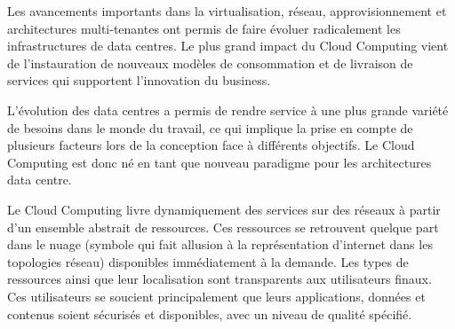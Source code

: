 Les avancements importants dans la virtualisation, réseau, approvisionnement et architectures multi-tenantes ont permis de faire évoluer radicalement les infrastructures de data centres. Le plus grand impact du Cloud Computing vient de l'instauration de nouveaux modèles de consommation et de livraison de services qui supportent l'innovation du business.



L'évolution des data centres a permis de rendre service à une plus grande variété de besoins dans le monde du travail, ce qui implique la prise en compte de plusieurs facteurs lors de la conception face à différents objectifs. Le Cloud Computing est donc né en tant que nouveau paradigme pour les architectures data centre.


Le Cloud Computing livre dynamiquement des services sur des réseaux à partir d'un ensemble abstrait de ressources. Ces ressources se retrouvent quelque part dans le \og nuage \fg{} (symbole qui fait allusion à la représentation d'internet dans les topologies réseau) disponibles immédiatement à la demande. Les types de ressources ainsi que leur localisation sont transparents aux utilisateurs finaux. Ces utilisateurs se soucient principalement que leurs applications, données et contenus soient sécurisés et disponibles, avec un niveau de qualité spécifié.


